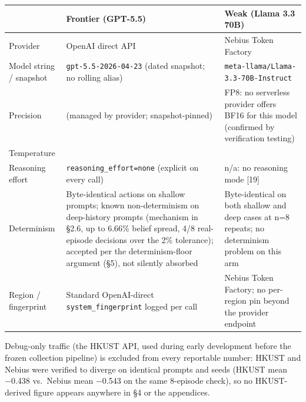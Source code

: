 \documentclass[
  10pt,
]{article}
\newcounter{none} %
\begin{document}
{\def\LTcaptype{none} %
\begin{longtable}[]{@{}
  >{\raggedright\arraybackslash}p{}
  >{\raggedright\arraybackslash}p{}
  >{\raggedright\arraybackslash}p{}@{}}
\toprule\noalign{}
\begin{minipage}[b]{\linewidth}\raggedright
\end{minipage} & \begin{minipage}[b]{\linewidth}\raggedright
Frontier (GPT-5.5)
\end{minipage} & \begin{minipage}[b]{\linewidth}\raggedright
Weak (Llama 3.3 70B)
\end{minipage} \\
\midrule\noalign{}
\endhead
\bottomrule\noalign{}
\endlastfoot
Provider & OpenAI direct API & Nebius Token Factory \\
Model string / snapshot & \texttt{gpt-5.5-2026-04-23} (dated snapshot; no rolling alias) & \texttt{meta-llama/Llama-3.3-70B-Instruct} \\
Precision & (managed by provider; snapshot-pinned) & FP8: no serverless provider offers BF16 for this model (confirmed by verification testing) \\
Temperature & 0 & 0 \\
Reasoning effort & \texttt{reasoning\_effort=\textquotesingle{}none\textquotesingle{}} (explicit on every call) & n/a: no reasoning mode {[}19{]} \\
Determinism & Byte-identical actions on shallow prompts; known non-determinism on deep-history prompts (mechanism in §2.6, up to 6.66\% belief spread, 4/8 real-episode decisions over the 2\% tolerance); accepted per the determinism-floor argument (§5), not silently absorbed & Byte-identical on both shallow and deep cases at n=8 repeats; no determinism problem on this arm \\
Region / fingerprint & Standard OpenAI-direct \texttt{system\_fingerprint} logged per call & Nebius Token Factory; no per-region pin beyond the provider endpoint \\
\end{longtable}
}

Debug-only traffic (the HKUST API, used during early development before the frozen collection pipeline) is excluded from every reportable number: HKUST and Nebius were verified to diverge on identical prompts and seeds (HKUST mean −0.438 vs.~Nebius mean −0.543 on the same 8-episode check), so no HKUST-derived figure appears anywhere in §4 or the appendices.
\end{document}
